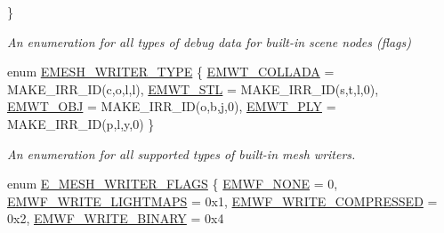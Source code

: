 \begin{DoxyCompactItemize}
 \}\begin{DoxyCompactList}\small\item\em An enumeration for all types of debug data for built-\/in scene nodes (flags) \end{DoxyCompactList}
\item 
enum \hyperlink{namespaceirr_1_1scene_a431fa15741518ba15f6d5f2608b6cb4e}{E\+M\+E\+S\+H\+\_\+\+W\+R\+I\+T\+E\+R\+\_\+\+T\+Y\+PE} \{ \hyperlink{namespaceirr_1_1scene_a431fa15741518ba15f6d5f2608b6cb4eab64eaf09eb12d2361e67066b86529ba8}{E\+M\+W\+T\+\_\+\+C\+O\+L\+L\+A\+DA} = M\+A\+K\+E\+\_\+\+I\+R\+R\+\_\+\+ID(\textquotesingle{}c\textquotesingle{},\textquotesingle{}o\textquotesingle{},\textquotesingle{}l\textquotesingle{},\textquotesingle{}l\textquotesingle{}), 
\hyperlink{namespaceirr_1_1scene_a431fa15741518ba15f6d5f2608b6cb4ea8608bd1e505d53e6cc2e7c477b31d8a1}{E\+M\+W\+T\+\_\+\+S\+TL} = M\+A\+K\+E\+\_\+\+I\+R\+R\+\_\+\+ID(\textquotesingle{}s\textquotesingle{},\textquotesingle{}t\textquotesingle{},\textquotesingle{}l\textquotesingle{},0), 
\hyperlink{namespaceirr_1_1scene_a431fa15741518ba15f6d5f2608b6cb4eae22b9ef8ea7befd1368d7b90bbe12992}{E\+M\+W\+T\+\_\+\+O\+BJ} = M\+A\+K\+E\+\_\+\+I\+R\+R\+\_\+\+ID(\textquotesingle{}o\textquotesingle{},\textquotesingle{}b\textquotesingle{},\textquotesingle{}j\textquotesingle{},0), 
\hyperlink{namespaceirr_1_1scene_a431fa15741518ba15f6d5f2608b6cb4ead00c87763ef520a5115e9920968c0108}{E\+M\+W\+T\+\_\+\+P\+LY} = M\+A\+K\+E\+\_\+\+I\+R\+R\+\_\+\+ID(\textquotesingle{}p\textquotesingle{},\textquotesingle{}l\textquotesingle{},\textquotesingle{}y\textquotesingle{},0)
 \}\begin{DoxyCompactList}\small\item\em An enumeration for all supported types of built-\/in mesh writers. \end{DoxyCompactList}
\item 
enum \hyperlink{namespaceirr_1_1scene_a9faae6cd9e415a0553cb4cdc190bbc1d}{E\+\_\+\+M\+E\+S\+H\+\_\+\+W\+R\+I\+T\+E\+R\+\_\+\+F\+L\+A\+GS} \{ \hyperlink{namespaceirr_1_1scene_a9faae6cd9e415a0553cb4cdc190bbc1daf2dfebddfd0a2cd2b558e23cb6a87464}{E\+M\+W\+F\+\_\+\+N\+O\+NE} = 0, 
\hyperlink{namespaceirr_1_1scene_a9faae6cd9e415a0553cb4cdc190bbc1daee23ec8ad339e67c03c424d5adb94a66}{E\+M\+W\+F\+\_\+\+W\+R\+I\+T\+E\+\_\+\+L\+I\+G\+H\+T\+M\+A\+PS} = 0x1, 
\hyperlink{namespaceirr_1_1scene_a9faae6cd9e415a0553cb4cdc190bbc1dac7c70ee80dc1a33aac68d317cb9c2cb7}{E\+M\+W\+F\+\_\+\+W\+R\+I\+T\+E\+\_\+\+C\+O\+M\+P\+R\+E\+S\+S\+ED} = 0x2, 
\hyperlink{namespaceirr_1_1scene_a9faae6cd9e415a0553cb4cdc190bbc1da06511a5df874b2b69a146e0bbcb70309}{E\+M\+W\+F\+\_\+\+W\+R\+I\+T\+E\+\_\+\+B\+I\+N\+A\+RY} = 0x4

\end{DoxyCompactItemize}
